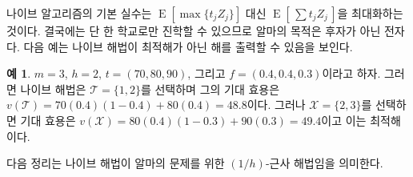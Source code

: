 \documentclass[11pt]{article} %
\newif\ifen
\theoremstyle{definition}
\newtheorem{example}{Example}
\theoremstyle{definition}
\newtheorem{example}{예}
\begin{document}
나이브 알고리즘의 기본 실수는 $\operatorname{E}\left[\max \{t_j Z_j\} \right]$ 대신  $\operatorname{E}\left[\,\sum t_j Z_j\,\right]$을 최대화하는 것이다. 결국에는 단 한 학교로만 진학할 수 있으므로 알마의 목적은 후자가 아닌 전자다. %
다음 예는 나이브 해법이 최적해가 아닌 해를 출력할 수 있음을 보인다.
\fi
\begin{example}
\ifen 
Suppose $m=3$, $h=2$,  $ t= (70, 80, 90) $, and $f = (0.4, 0.4, 0.3)$. 
Then the na\"ive algorithm picks $\mathcal{T} = \{1, 2\}$ with 
$v(\mathcal{T}) = 70(0.4)(1-0.4) + 80(0.4) = 48.8$.
But $\mathcal{X} = \{2, 3\}$ with
$v(\mathcal{X}) = 80(0.4)(1-0.3) + 90(0.3) = 49.4$
is the optimal solution. 
\else
$m=3$, $h=2$,  $ t= (70, 80, 90) $, 그리고 $f = (0.4, 0.4, 0.3)$이라고 하자. 그러면 나이브 해법은 $\mathcal{T} = \{1, 2\}$를 선택하며 그의 기대 효용은 $v(\mathcal{T}) = 70(0.4)(1-0.4) + 80(0.4) = 48.8$이다. 그러나 $\mathcal{X} = \{2, 3\}$를 선택하면 기대 효용은 $v(\mathcal{X}) = 80(0.4)(1-0.3) + 90(0.3) = 49.4$이고 이는 최적해이다.
\fi
\end{example}
\ifen
\noindent In fact, the na\"ive algorithm is a $(1/h)$-approximation algorithm for Alma’s problem, as expressed in the following theorem.
\else
\noindent 다음 정리는 나이브 해법이 알마의 문제를 위한 $(1/h)$-근사 해법임을 의미한다.
\fi
\end{document}

